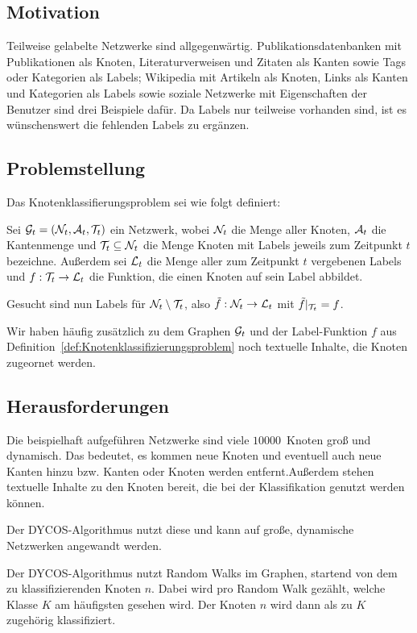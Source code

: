 \subsection{Motivation}
Teilweise gelabelte Netzwerke sind allgegenwärtig. Publikationsdatenbanken
mit Publikationen als Knoten, Literaturverweisen und Zitaten als Kanten
sowie Tags oder Kategorien als Labels;
Wikipedia mit Artikeln als Knoten, Links als Kanten und Kategorien
als Labels sowie soziale Netzwerke mit Eigenschaften der Benutzer
sind drei Beispiele dafür.
Da Labels nur teilweise vorhanden sind, ist es wünschenswert die 
fehlenden Labels zu ergänzen. 

\subsection{Problemstellung}
Das Knotenklassifierungsproblem sei wie folgt definiert:\\

\begin{definition}[Knotenklassifierungsproblem]\label{def:Knotenklassifizierungsproblem}
    Sei $\mathcal{G}_t = (\mathcal{N}_t, \mathcal{A}_t, \mathcal{T}_t)$ ein Netzwerk,
    wobei $\mathcal{N}_t$ die Menge aller Knoten,
    $\mathcal{A}_t$ die Kantenmenge und $\mathcal{T}_t \subseteq \mathcal{N}_t$ die Menge Knoten mit Labels 
    jeweils zum Zeitpunkt $t$ bezeichne.
    Außerdem sei $\mathcal{L}_t$ die Menge aller zum Zeitpunkt $t$ vergebenen
    Labels und $f:\mathcal{T}_t \rightarrow \mathcal{L}_t$ die Funktion, die einen
    Knoten auf sein Label abbildet.

    Gesucht sind nun Labels für $\mathcal{N}_t \setminus \mathcal{T}_t$, also
    $\tilde{f}:\mathcal{N}_t \rightarrow \mathcal{L}_t$ mit 
    $\tilde{f}|_{\mathcal{T}_t} = f$.
\end{definition}

Wir haben häufig zusätzlich zu dem Graphen $\mathcal{G}_t$ und der Label-Funktion
$f$ aus Definition~\ref{def:Knotenklassifizierungsproblem} noch
textuelle Inhalte, die Knoten zugeornet werden. 


\subsection{Herausforderungen}
Die beispielhaft aufgeführen Netzwerke sind viele 
$\num{10000}$~Knoten groß und dynamisch. Das bedeutet, es kommen
neue Knoten und eventuell auch neue Kanten hinzu bzw. Kanten oder
Knoten werden entfernt.Außerdem stehen 
textuelle Inhalte zu den Knoten bereit, die bei der Klassifikation 
genutzt werden können.

Der DYCOS-Algorithmus nutzt diese und kann auf große, dynamische
Netzwerken angewandt werden.

Der DYCOS-Algorithmus nutzt Random Walks im Graphen, startend 
von dem zu klassifizierenden Knoten $n$. Dabei wird pro Random Walk
gezählt, welche Klasse $K$ am häufigsten gesehen wird. Der Knoten $n$
wird dann als zu $K$ zugehörig klassifiziert.
